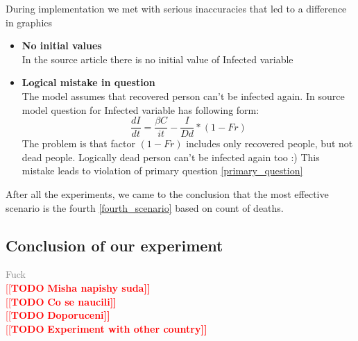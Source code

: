 \documentclass[12pt,a4paper,english]{article}
\newcommand{\todo}[1]{\noindent\textcolor{red}{[[\textbf{TODO} \textbf{#1]]}}\\}
\newcommand{\phony}[1]{\textcolor{gray}{#1} \\}
\begin{document}
    During implementation we met with serious inaccuracies that led to a difference in graphics
    \begin{itemize}
        \item \textbf{No initial values}\\ In the source article there is no initial value of Infected variable
        \item \textbf{Logical mistake in question}\\
        The model assumes that recovered person can't be infected again.
        In source model question for Infected variable has following form:
        $$\frac{dI}{dt} = \frac{\beta C}{it} - \frac{I}{Dd} * (1 - Fr)$$
        \noindent The problem is that factor $(1 - Fr)$ includes only recovered people, but not dead people. Logically dead person can't be infected again too :)
        This mistake leads to violation of primary question \eqref{primary_question}
    \end{itemize}

    After all the experiments, we came to the conclusion that the most effective  scenario is the fourth \eqref{fourth_scenario} based on count of deaths.

    \subsection{Conclusion of our experiment}


    \phony{Fuck}
    \todo{Misha napishy suda}


    \todo{Co se naucili}
    \todo{Doporuceni}    
    \todo{Experiment with other country}

    \clearpage
	
	
\end{document}
